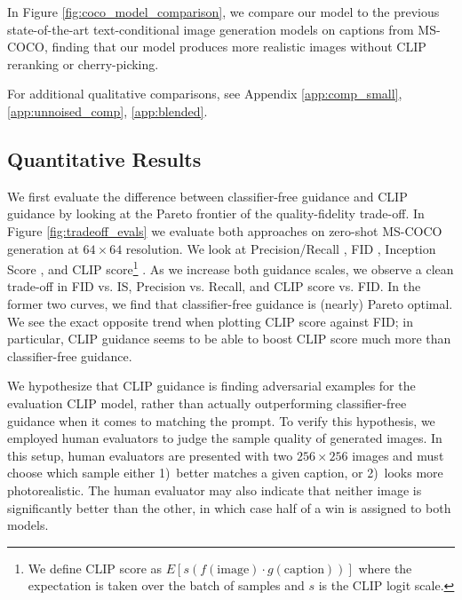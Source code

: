 \documentclass{article}
\begin{document}
In Figure \ref{fig:coco_model_comparison}, we compare our model to the previous state-of-the-art text-conditional image generation models on captions from MS-COCO, finding that our model produces more realistic images without CLIP reranking or cherry-picking.

For additional qualitative comparisons, see Appendix \ref{app:comp_small}, \ref{app:unnoised_comp}, \ref{app:blended}. 

\subsection{Quantitative Results}
\label{sec:quantitative_results}

We first evaluate the difference between classifier-free guidance and CLIP guidance by looking at the Pareto frontier of the quality-fidelity trade-off. In Figure \ref{fig:tradeoff_evals} we evaluate both approaches on zero-shot MS-COCO generation at $64 \times 64$ resolution. We look at Precision/Recall \mbox{\citep{precrecall}}, FID \mbox{\citep{fid}}, Inception Score \mbox{\citep{inceptionscore}}, and CLIP score\footnote{We define CLIP score as $E[s (f(\textrm{image})\cdot g(\textrm{caption}))]$ where the expectation is taken over the batch of samples and $s$ is the CLIP logit scale.} \citep{clip}. As we increase both guidance scales, we observe a clean trade-off in FID vs. IS, Precision vs. Recall, and CLIP score vs. FID. In the former two curves, we find that classifier-free guidance is (nearly) Pareto optimal. We see the exact opposite trend when plotting CLIP score against FID; in particular, CLIP guidance seems to be able to boost CLIP score much more than classifier-free guidance.

We hypothesize that CLIP guidance is finding adversarial examples for the evaluation CLIP model, rather than actually outperforming classifier-free guidance when it comes to matching the prompt. To verify this hypothesis, we employed human evaluators to judge the sample quality of generated images. In this setup, human evaluators are presented with two $256 \times 256$ images and must choose which sample either 1)~better matches a given caption, or 2)~looks more photorealistic. The human evaluator may also indicate that neither image is significantly better than the other, in which case half of a win is assigned to both models.
\end{document}
